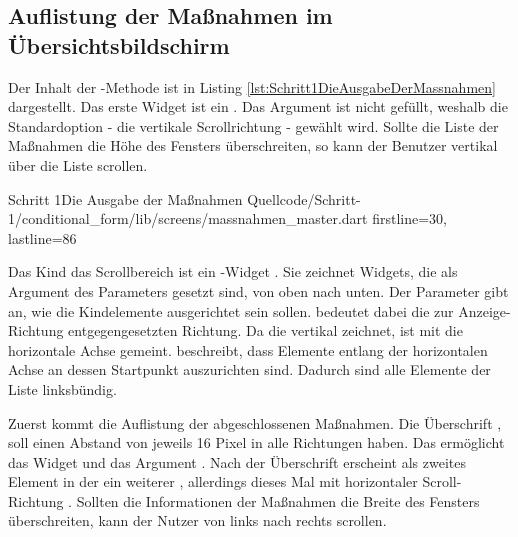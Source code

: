 \subsection{Auflistung der Maßnahmen im Übersichtsbildschirm}

Der Inhalt der -Methode ist in Listing \ref{lst:Schritt1DieAusgabeDerMassnahmen} dargestellt.
Das erste Widget ist ein  .
Das Argument  ist nicht gefüllt, weshalb die Standardoption - die vertikale Scrollrichtung - gewählt wird.
Sollte die Liste der Maßnahmen die Höhe des Fensters überschreiten, so kann der Benutzer vertikal über die Liste scrollen.

\begin{alexlisting}{Schritt 1}{Die Ausgabe der Maßnahmen}
  {Quellcode/Schritt-1/conditional_form/lib/screens/massnahmen_master.dart}
  {firstline=30, lastline=86}
  \label{lst:Schritt1DieAusgabeDerMassnahmen}
\end{alexlisting}

Das Kind das Scrollbereich ist ein -Widget .
Sie zeichnet Widgets, die als Argument des Parameters  gesetzt sind, von oben nach unten.
Der Parameter  gibt an, wie die Kindelemente ausgerichtet sein sollen.  bedeutet dabei die zur Anzeige-Richtung entgegengesetzten Richtung. Da die  vertikal zeichnet, ist mit  die horizontale Achse gemeint.  beschreibt, dass Elemente entlang der horizontalen Achse an dessen Startpunkt auszurichten sind. Dadurch sind alle Elemente der Liste linksbündig.

Zuerst kommt die Auflistung der abgeschlossenen Maßnahmen.
Die Überschrift  , soll einen Abstand von jeweils 16 Pixel in alle Richtungen haben.
Das ermöglicht das Widget   und das Argument . Nach der Überschrift erscheint als zweites Element in der  ein weiterer  , allerdings dieses Mal mit horizontaler Scroll-Richtung . Sollten die Informationen der Maßnahmen die Breite des Fensters überschreiten, kann der Nutzer von links nach rechts scrollen.

